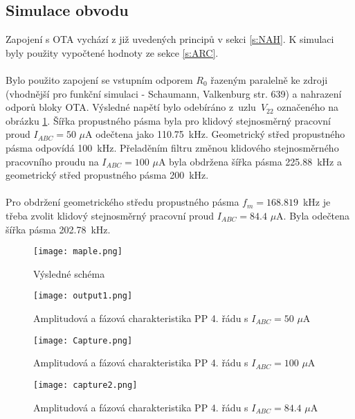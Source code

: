 \subsection{Simulace obvodu}
\noindent  Zapojení s OTA vychází z již uvedených principů v sekci \ref{s:NAH}. K simulaci byly použity vypočtené hodnoty ze sekce \ref{s:ARC}. \\
\\
\noindent Bylo použito zapojení se vstupním odporem $R_0$ řazeným paralelně ke zdroji (vhodnější pro funkční simulaci - Schaumann, Valkenburg \cite{13} str. 639) a nahrazení odporů bloky OTA. Výsledné napětí bylo odebíráno z~uzlu~$V_{22}$ označeného na obrázku \ref{s:V1}. Šířka propustného pásma byla pro klidový stejnosměrný pracovní proud $I_{ABC} = 50$ $\mu$A odečtena jako 110.75~kHz. Geometrický střed propustného pásma odpovídá 100~kHz. Přeladěním filtru změnou klidového stejnosměrného pracovního proudu na $I_{ABC} = 100$ $\mu$A byla obdržena šířka pásma 225.88~kHz a geometrický střed propustného pásma 200~kHz. \\
\\
Pro obdržení geometrického středu propustného pásma $f_m = 168.819$~kHz je třeba zvolit klidový stejnosměrný pracovní proud $I_{ABC} = 84.4$ $\mu$A. Byla odečtena šířka pásma 202.78~kHz. 
\begin{figure}[h]
\centering
\texttt{[image: maple.png]}
\caption{Výsledné schéma\label{s:V1}}
\end{figure}
\begin{figure}[h]
\centering
\texttt{[image: output1.png]}
\caption{Amplitudová a fázová charakteristika PP 4. řádu s $I_{ABC} = 50$ $\mu$A}
\end{figure}
\begin{figure}[h]
\centering
\texttt{[image: Capture.png]}
\caption{Amplitudová a fázová charakteristika PP 4. řádu s $I_{ABC} = 100$ $\mu$A}
\end{figure}
\begin{figure}[h]
\centering
\texttt{[image: capture2.png]}
\caption{Amplitudová a fázová charakteristika PP 4. řádu s $I_{ABC} = 84.4$ $\mu$A}
\end{figure}
